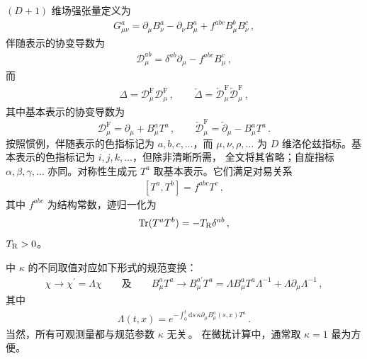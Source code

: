 $(D+1)$ 维场强张量定义为
\begin{align}
  G_{\mu\nu}^a = \partial_\mu B_\nu^a - \partial_\nu B_\mu^a + f^{abc}
  B_\mu^b B_\nu^c\,,
\end{align}
伴随表示的协变导数为
\begin{align}
  \mathcal{D}_\mu^{ab} = \delta^{ab} \partial_\mu - f^{abc} B_\mu^c\,,
\end{align}
而
\begin{equation}
  \begin{split}
    \Delta = \mathcal{D}^\mathrm{F}_\mu \mathcal{D}^\mathrm{F}_\mu
    \,,\qquad
    \overleftarrow{\Delta} = \overleftarrow{\mathcal{D}}^\mathrm{F}_\mu
    \overleftarrow{\mathcal{D}}^\mathrm{F}_\mu \,,
  \end{split}
\end{equation}
其中基本表示的协变导数为
\begin{equation}
  \mathcal{D}^\mathrm{F}_\mu = \partial_\mu + B^a_\mu T^a \,,\qquad
  \overleftarrow{\mathcal{D}}^\mathrm{F}_\mu =
    \overleftarrow{\partial}_\mu - B^a_\mu T^a \,.
\end{equation}
按照惯例，伴随表示的色指标记为 $a,b,c,\ldots$，而 $\mu,\nu,\rho,\ldots$
为 $D$ 维洛伦兹指标。基本表示的色指标记为 $i,j,k,\ldots$，但除非清晰所需，
全文将其省略；自旋指标 $\alpha,\beta,\gamma,\ldots$ 亦同。对称性生成元
$T^a$ 取基本表示。它们满足对易关系
\begin{equation}
  \begin{split}
    [T^a,T^b] = f^{abc}T^c\,,
  \end{split}
\end{equation}
其中 $f^{abc}$ 为结构常数，迹归一化为
\begin{equation}
  \mathrm{Tr}(T^a T^b) = - T_\mathrm{R} \delta^{ab} \, ,
\end{equation}
$T_\mathrm{R} > 0$。

 中 $\kappa$ 的不同取值对应如下形式的规范变换：
\begin{align}
  \chi \rightarrow \chi^\prime = \Lambda \chi \quad \quad \text{及}
  \quad \quad B_\mu^a T^a \rightarrow B_\mu^{a\prime} T^a= \Lambda
  B_\mu^a T^a \Lambda^{-1} + \Lambda \partial_\mu \Lambda^{-1}\,,
\end{align}
其中
\begin{align}
  \Lambda(t,x)=e^{-\int_0^t \mathrm{d}s \, \kappa \partial_\mu B_\mu^a(s,x) T^a}\,.
\end{align}
当然，所有可观测量都与规范参数 $\kappa$ 无关\,\cite{Luscher:2010iy}。
在微扰计算中，通常取 $\kappa = 1$ 最为方便。

